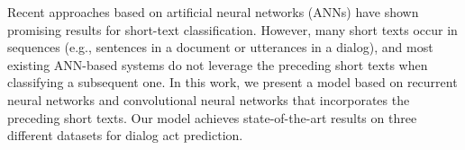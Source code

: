 Recent approaches based on artificial neural networks (ANNs) have shown promising results for short-text classification. However, many short texts occur in sequences (e.g., sentences in a document or utterances in a dialog), and most existing ANN-based systems do not leverage the preceding short texts when classifying a subsequent one. In this work, we present a model based on recurrent neural networks and convolutional neural networks that incorporates the preceding short texts. Our model achieves state-of-the-art results on three different datasets for dialog act prediction.
